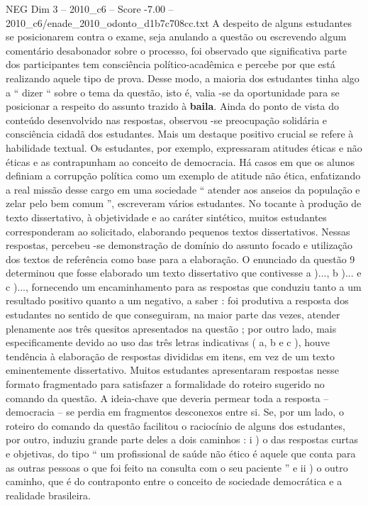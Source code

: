 \begin{textsample}{NEG Dim 3 – 2010\_c6 – Score -7.00 – 2010\_c6/enade\_2010\_odonto\_d1b7c708cc.txt}
A despeito de alguns estudantes se posicionarem contra o exame, seja anulando a questão ou escrevendo algum comentário desabonador sobre o processo, foi observado que significativa parte dos participantes tem consciência político-acadêmica e percebe por que está realizando aquele tipo de prova.
Desse modo, a maioria dos estudantes tinha algo a “ dizer “ sobre o tema da questão, isto é, valia -se da oportunidade para se posicionar a respeito do assunto trazido à \textbf{baila}.
Ainda do ponto de vista do conteúdo desenvolvido nas respostas, observou -se preocupação solidária e consciência cidadã dos estudantes.
Mais um destaque positivo crucial se refere à habilidade textual.
Os estudantes, por exemplo, expressaram atitudes éticas e não éticas e as contrapunham ao conceito de democracia.
Há casos em que os alunos definiam a corrupção política como um exemplo de atitude não ética, enfatizando a real missão desse cargo em uma sociedade “ atender aos anseios da população e zelar pelo bem comum ”, escreveram vários estudantes.
No tocante à produção de texto dissertativo, à objetividade e ao caráter sintético, muitos estudantes corresponderam ao solicitado, elaborando pequenos textos dissertativos.
Nessas respostas, percebeu -se demonstração de domínio do assunto focado e utilização dos textos de referência como base para a elaboração.
O enunciado da questão 9 determinou que fosse elaborado um texto dissertativo que contivesse a )..., b )... e c )..., fornecendo um encaminhamento para as respostas que conduziu tanto a um resultado positivo quanto a um negativo, a saber : foi produtiva a resposta dos estudantes no sentido de que conseguiram, na maior parte das vezes, atender plenamente aos três quesitos apresentados na questão ; por outro lado, mais especificamente devido ao uso das três letras indicativas ( a, b e c ), houve tendência à elaboração de respostas divididas em itens, em vez de um texto eminentemente dissertativo.
Muitos estudantes apresentaram respostas nesse formato fragmentado para satisfazer a formalidade do roteiro sugerido no comando da questão.
A ideia-chave que deveria permear toda a resposta – democracia – se perdia em fragmentos desconexos entre si.
Se, por um lado, o roteiro do comando da questão facilitou o raciocínio de alguns dos estudantes, por outro, induziu grande parte deles a dois caminhos : i ) o das respostas curtas e objetivas, do tipo “ um profissional de saúde não ético é aquele que conta para as outras pessoas o que foi feito na consulta com o seu paciente ” e ii ) o outro caminho, que é do contraponto entre o conceito de sociedade democrática e a realidade brasileira.

\end{textsample}
